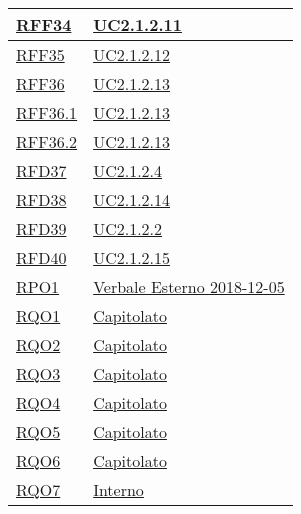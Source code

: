 \begin{longtable}{|>{\centering}m{5cm}|m{5cm}<{\centering}|}
	\hyperlink{RFF34}{RFF34} & \hyperref[UC2.1.2.11]{UC2.1.2.11}\\ \hline
	
	\hyperlink{RFF35}{RFF35} & \hyperref[UC2.1.2.12]{UC2.1.2.12}\\ \hline
	
	\hyperlink{RFF36}{RFF36} & \hyperref[UC2.1.2.13]{UC2.1.2.13}\\ \hline
	
	\hyperlink{RFF36.1}{RFF36.1} & \hyperref[UC2.1.2.13]{UC2.1.2.13}\\ \hline
	
	\hyperlink{RFF36.2}{RFF36.2} & \hyperref[UC2.1.2.13]{UC2.1.2.13}\\ \hline
	
	\hyperlink{RFD37}{RFD37} & \hyperref[UC2.1.2.4]{UC2.1.2.4}\\ \hline
	
	\hyperlink{RFD38}{RFD38} & \hyperref[UC2.1.2.14]{UC2.1.2.14}\\ \hline
	
	\hyperlink{RFD39}{RFD39} & \hyperref[UC2.1.2.2]{UC2.1.2.2}\\ \hline
	
	\hyperlink{RFD40}{RFD40} & \hyperref[UC2.1.2.15]{UC2.1.2.15}\\ \hline
	
	\hyperlink{RPO1}{RPO1} & \hyperref[Verbale Esterno 2018-12-05]{Verbale Esterno 2018-12-05}\\ \hline
	
	\hyperlink{RQO1}{RQO1} & \hyperref[Capitolato]{Capitolato}\\ \hline
	
	\hyperlink{RQO2}{RQO2} & \hyperref[Capitolato]{Capitolato}\\ \hline
	
	\hyperlink{RQO3}{RQO3} & \hyperref[Capitolato]{Capitolato}\\ \hline
	
	\hyperlink{RQO4}{RQO4} & \hyperref[Capitolato]{Capitolato}\\ \hline
	
	\hyperlink{RQO5}{RQO5} & \hyperref[Capitolato]{Capitolato}\\ \hline
	
	\hyperlink{RQO6}{RQO6} & \hyperref[Capitolato]{Capitolato}\\ \hline
	
	\hyperlink{RQO7}{RQO7} & \hyperref[Interno]{Interno}\\ \hline
	

\end{longtable}
